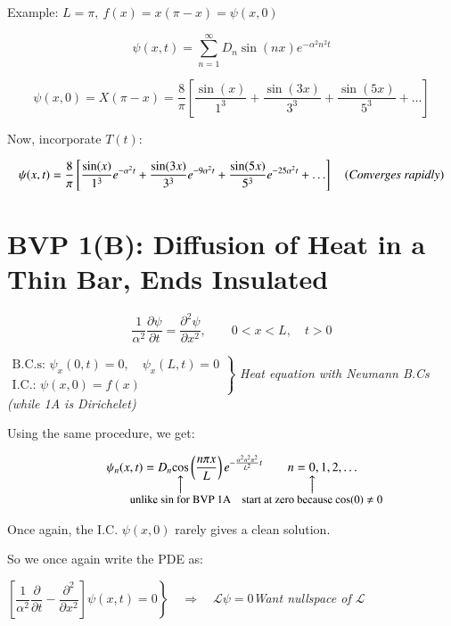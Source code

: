 \documentclass{report}
\makeatletter
\newcommand\parrow[3][3ex]{%
 \begin{array}[t]{@{}c@{}} #2 \\
  \left\uparrow\vcenter{\hrule height #1}\right.\kern-\nulldelimiterspace\\
  \makebox[0pt]{\small#3}
  \end{array}%
}
\makeatother
\begin{document}
Example: $L=\pi,\ f(x)=x(\pi-x)=\psi(x,0)$\\

\begin{center}
\end{center}

$$
\psi(x,t)=\sum\limits_{n=1}^{\infty}D_n\sin(nx)e^{-\alpha^2n^2t}
$$

$$
\psi(x,0)=X(\pi-x)=\dfrac{8}{\pi}\left[\dfrac{\sin(x)}{1^3}+\dfrac{\sin(3x)}{3^3}+\dfrac{\sin(5x)}{5^3}+\ldots\right]
$$

Now, incorporate $T(t)$:

$$
\psi(x,t)=\dfrac{8}{\pi}\left[\dfrac{\sin(x)}{1^3}e^{-\alpha^2t}+\dfrac{\sin(3x)}{3^3}e^{-9\alpha^2t}+\dfrac{\sin(5x)}{5^3}e^{-25\alpha^2t}+\ldots\right]\quad \text{(\textit{Converges rapidly})}
$$

\section{BVP 1(B): Diffusion of Heat in a Thin Bar, Ends Insulated}

$$\dfrac{1}{\alpha^2}\dfrac{\partial \psi}{\partial t}=\dfrac{\partial^2\psi}{\partial x^2},\qquad 0<x<L,\quad t>0$$

$\left.\begin{array}{l}
     \text{B.C.s: } \psi_x(0,t)=0,\quad \psi_x(L,t)=0\\
     \text{I.C.: } \psi(x,0)=f(x) 
\end{array}\right\}$ \textit{Heat equation with Neumann B.Cs (while 1A is Dirichelet)}

Using the same procedure, we get:

$$\psi_n(x,t)=D_n\parrow{\cos}{unlike sin for BVP 1A}\left(\dfrac{n\pi x}{L}\right)e^{-\frac{\alpha^2n^2\pi^2}{L^2}t}\qquad n=\parrow{0}{start at zero because $\cos(0)\neq 0$},1,2,\ldots$$

Once again, the I.C. $\psi(x,0)$ rarely gives a clean solution.

So we once again write the PDE as:

$\left.\left[\dfrac{1}{\alpha^2}\dfrac{\partial}{\partial t}-\dfrac{\partial^2}{\partial x^2}\right]\psi(x,t)=0\right\}\quad\Rightarrow\quad \mathcal{L}\psi=0$\qquad \textit{Want nullspace of $\mathcal{L}$}
\end{document}
